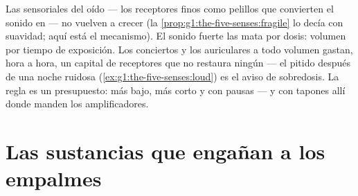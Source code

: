 \begin{proposition}\label{prop:g8:protecting-the-nervous-system:noise}
Las  sensoriales del oído --- los receptores finos como pelillos
que convierten el sonido en  --- no vuelven a crecer
(la \cref{prop:g1:the-five-senses:fragile} lo decía con suavidad; aquí
está el mecanismo). El sonido fuerte las mata por dosis: volumen por
tiempo de exposición. Los conciertos y los auriculares a todo volumen
gastan, hora a hora, un capital de receptores que no restaura ningún
 --- el pitido después de una noche ruidosa
(\cref{ex:g1:the-five-senses:loud}) es el aviso de sobredosis. La regla
es un presupuesto: más bajo, más corto y con pausas --- y con tapones
allí donde manden los amplificadores.
\end{proposition}
\admitted

\section{Las sustancias que engañan a los empalmes}


